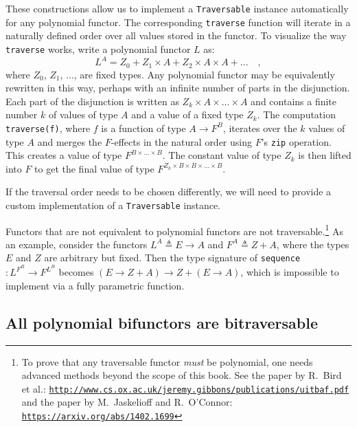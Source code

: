 These constructions allow us to implement a \lstinline!Traversable!
instance automatically for any polynomial functor. The corresponding
\lstinline!traverse! function will iterate in a naturally defined
order over all values stored in the functor. To visualize the way
\lstinline!traverse! works, write a polynomial functor $L$ as:
\[
L^{A}=Z_{0}+Z_{1}\times A+Z_{2}\times A\times A+...\quad,
\]
where $Z_{0}$, $Z_{1}$, ..., are fixed types. Any polynomial functor
may be equivalently rewritten in this way, perhaps with an infinite
number of parts in the disjunction. Each part of the disjunction is
written as $Z_{k}\times A\times...\times A$ and contains a finite
number $k$ of values of type $A$ and a value of a fixed type $Z_{k}$.
The computation \lstinline!traverse(f)!, where $f$ is a function
of type $A\rightarrow F^{B}$, iterates over the $k$ values of type
$A$ and merges the $F$-effects in the natural order using $F$\textsf{'}s
\lstinline!zip! operation. This creates a value of type $F^{B\times...\times B}$.
The constant value of type $Z_{k}$ is then lifted into $F$ to get
the final value of type $F^{Z_{k}\times B\times B\times...\times B}$.

If the traversal order needs to be chosen differently, we will need
to provide a custom implementation of a \lstinline!Traversable! instance.

Functors that are not equivalent to polynomial functors are not traversable.\footnote{To prove that any traversable functor \emph{must} be polynomial, one
needs advanced methods beyond the scope of this book. See the paper
by R.~Bird et al.: \texttt{\href{http://www.cs.ox.ac.uk/jeremy.gibbons/publications/uitbaf.pdf}{http://www.cs.ox.ac.uk/jeremy.gibbons/publications/uitbaf.pdf}}
and the paper by M.~Jaskelioff and R.~O\textsf{'}Connor:
\texttt{\href{https://arxiv.org/abs/1402.1699}{https://arxiv.org/abs/1402.1699}}} As an example, consider the functors $L^{A}\triangleq E\rightarrow A$
and $F^{A}\triangleq Z+A$, where the types $E$ and $Z$ are arbitrary
but fixed. Then the type signature of \lstinline!sequence! $:L^{F^{B}}\rightarrow F^{L^{B}}$
becomes $(E\rightarrow Z+A)\rightarrow Z+(E\rightarrow A)$, which
is impossible to implement via a fully parametric function.

\subsection{All polynomial bifunctors are bitraversable\label{subsec:All-polynomial-bifunctors-are-bitraversable}}

